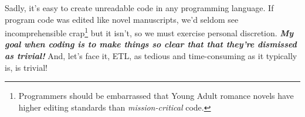 Sadly, it's easy to create unreadable
code in any programming language. If program code was edited like novel
manuscripts, we'd seldom see incomprehensible
crap\footnote{Programmers should be embarrassed that Young Adult romance novels have higher editing standards than \emph{mission-critical} code.}
but it isn't, so we must exercise personal discretion. \textbf{\emph{My
goal when coding is to make things so clear that that they're dismissed
as trivial!}} And, let's face it, ETL, as tedious and time-consuming as
it typically is, is trivial!
  
    
%
